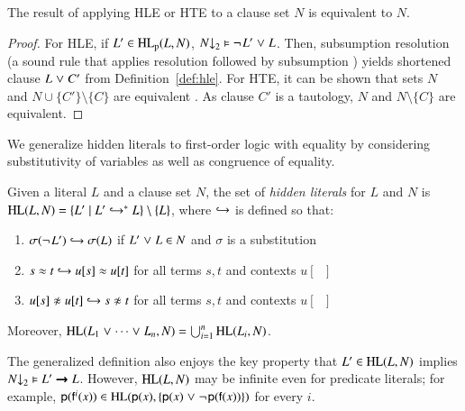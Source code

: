 \begin{theorem}
   The result of applying HLE or HTE to a clause set $N$ is
   equivalent to $N$.
\end{theorem}

\begin{proof}
For HLE, if $L' \in \PHL(L, N)$,  $\binset{N} \models \neglit{L'} \cor L$. Then,
subsumption resolution (a sound rule that applies resolution followed by
subsumption \cite{bg-01-resolution}) yields shortened clause $L \cor C'$ from
Definition~\ref{def:hle}. For HTE, it can be shown that sets $N$ and $N
\cup \{ C' \} \setminus \{C\}$ are equivalent
\cite[Sect.~2.1]{hjb-2011-big-simplification}. As clause $C'$ is a tautology,
$N$ and $N \setminus \{C\}$ are equivalent.\qedhere
\end{proof}

We generalize hidden literals to first-order logic with equality by
considering substitutivity of variables as well as congruence of equality.

\begin{defi}
\label{def:hl-fo}
Given a literal $L$ and a clause set $N$,
the set of \emph{hidden literals} for $L$ and $N$
is $\HL(L,N) = \{ L' \mid L' \bigfimpl{N}^\ast L \} \setminus \{ L \}$, where
$\bigfimpl{N}$ is defined so that:
\begin{enumerate}
    \item $\sigmaterm{\neglit{L'}} \bigfimpl{N} \sigmaterm{L}$ if
    $L' \cor L \in N$ and $\sigma$ is a substitution
    \item $\eqlit{s}{t} \bigfimpl{N} \eqlit{u[s]}{u[t]}$ for all terms $s, t$ and
    contexts $u[\phantom{\cdot}]$
    \item $\neqlit{u[s]}{u[t]} \bigfimpl{N} \neqlit{s}{t}$ for all terms $s, t$ and
    contexts $u[\phantom{\cdot}]$
\end{enumerate}
Moreover, $\HL(L_1 \cor \cdots \cor L_n, N) = \bigcup_{i=1}^n \HL(L_i, N)$.
\end{defi}

The generalized definition also enjoys the key property that $L'
\in \HL(L, N)$ implies $\binset{N} \models L' \impl L$. However, $\HL(L, N)$
may be infinite even for predicate literals; for example,
$\pospredlit{\cst{p}(\cst{f}^i(x))} \in \HL(\pospredlit{\cst{p}(x)}, \{\pospredlit{\cst{p}(x)} \cor
\negpredlit{\cst{p}(\cst{f}(x))} \})$ for every $i$.

